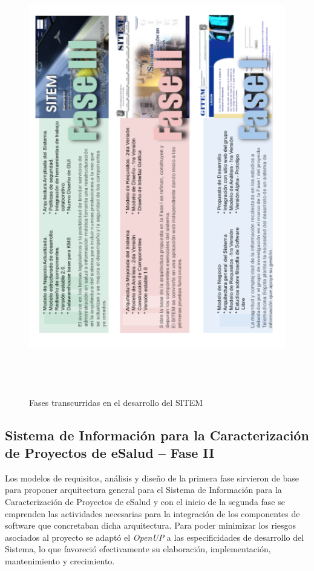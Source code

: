 \begin{figure}
 \centering
 \includegraphics[width=142mm, height=190mm]{fase_sitem.png}
 \caption{Fases transcurridas en el desarrollo del SITEM}
 \label{fase_sitem}
\end{figure}

\subsection{Sistema de Información para la Caracterización de Proyectos de eSalud – Fase II}

Los modelos de requisitos, análisis y diseño de la primera fase sirvieron de base para proponer arquitectura general para el Sistema de Información para la Caracterización de Proyectos de eSalud y con el inicio de la segunda fase se emprenden las actividades necesarias para la integración de los componentes de software que concretaban dicha arquitectura. Para poder minimizar los riesgos asociados al proyecto se adaptó el \textit{OpenUP} a las especificidades de desarrollo del Sistema, lo que favoreció efectivamente su elaboración, implementación, mantenimiento y crecimiento.

